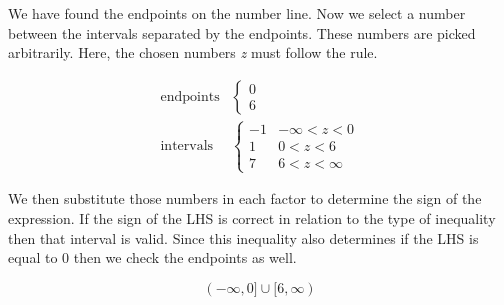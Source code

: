 \documentclass{amsbook}
\begin{document}
	We have found the endpoints on the number line.
	Now we select a number between the intervals separated by the endpoints.
	These numbers are picked arbitrarily.
	Here, the chosen numbers \textit{z} must follow the rule.

	\begin{align*}
		\text{endpoints}&
		\begin{cases}
			0 \\ 6
		\end{cases}	\\
		\text{intervals}&
		\begin{cases}
			-1& \text{$-\infty < z < 0$}	\\
			1&	\text{$0 < z < 6$}			\\
			7&	\text{$6 < z < \infty$}
		\end{cases}
	\end{align*}

	We then substitute those numbers in each factor to determine the sign
	of the expression.
	If the sign of the LHS is correct in relation to the type of inequality
	then that interval is valid.
	Since this inequality also determines if the LHS is equal to 0 then
	we check the endpoints as well.

	\begin{equation*}
		(-\infty, 0] \cup [6, \infty)
	\end{equation*}
\end{document}
